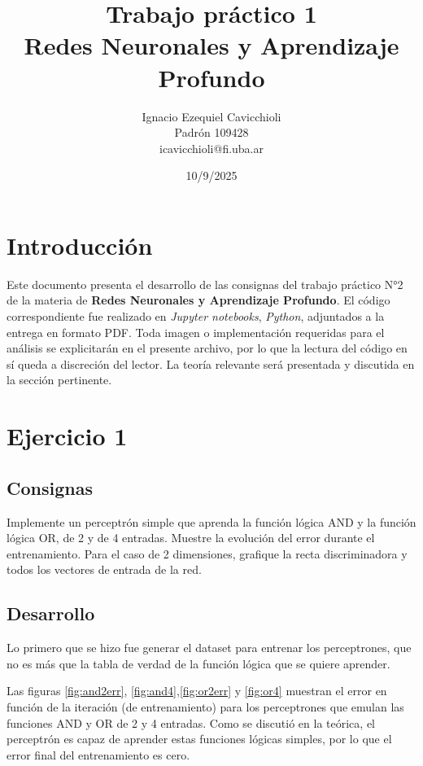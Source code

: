 \documentclass[11pt]{article} %
\title{Trabajo práctico 1\\ Redes Neuronales y Aprendizaje Profundo}
\author{Ignacio Ezequiel Cavicchioli\\Padrón 109428\\icavicchioli@fi.uba.ar}
\date{10/9/2025} %
\begin{document}
\maketitle

\tableofcontents



\section{Introducción}

Este documento presenta el desarrollo de las consignas del trabajo práctico N°2 de la materia de \textbf{Redes Neuronales y Aprendizaje Profundo}.  El código correspondiente fue realizado en  \textit{Jupyter notebooks}, \textit{Python}, adjuntados a la entrega en formato PDF. Toda imagen o implementación requeridas para el análisis se explicitarán en el presente archivo, por lo que la lectura del código en sí queda a discreción del lector. La teoría relevante será presentada y discutida en la sección pertinente.


\newpage

\section{Ejercicio 1}

\subsection{Consignas}

Implemente un perceptrón simple que aprenda la función lógica AND y la función lógica OR, de 2 y de 4 entradas. Muestre la evolución del error durante el entrenamiento. Para el caso de 2 dimensiones, grafique la recta discriminadora y todos los vectores de entrada de la red.

\subsection{Desarrollo}

Lo primero que se hizo fue generar el dataset para entrenar los perceptrones, que no es más que la tabla de verdad de la función lógica que se quiere aprender.

Las figuras \ref{fig:and2err}, \ref{fig:and4},\ref{fig:or2err} y \ref{fig:or4} muestran el error en función de la iteración (de entrenamiento) para los perceptrones que emulan las funciones AND y OR de 2 y 4 entradas. Como se discutió en la teórica, el perceptrón es capaz de aprender estas funciones lógicas simples, por lo que el error final del entrenamiento es cero.
\end{document}
